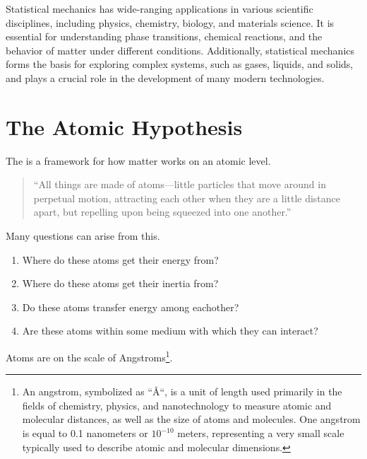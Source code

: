 Statistical mechanics has wide-ranging applications in various scientific disciplines, including physics, chemistry, biology, and materials science. It is essential for understanding phase transitions, chemical reactions, and the behavior of matter under different conditions. Additionally, statistical mechanics forms the basis for exploring complex systems, such as gases, liquids, and solids, and plays a crucial role in the development of many modern technologies.

\section{The Atomic Hypothesis}

The  is a framework for how matter works on an atomic level.

\begin{quotation}
	``All things are made of atoms—little particles that move around in perpetual motion, attracting each other when they are a little distance apart, but repelling upon being squeezed into one another.''
\end{quotation}

Many questions can arise from this.

\begin{enumerate}
	\item Where do these atoms get their energy from?
 	\item Where do these atoms get their inertia from?
  	\item Do these atoms transfer energy among eachother?
   	\item Are these atoms within some medium with which they can interact?
\end{enumerate}

Atoms are on the scale of Angstroms\footnote{An angstrom, symbolized as ``\AA``, is a unit of length used primarily in the fields of chemistry, physics, and nanotechnology to measure atomic and molecular distances, as well as the size of atoms and molecules. One angstrom is equal to 0.1 nanometers or $10^{-10}$ meters, representing a very small scale typically used to describe atomic and molecular dimensions.}. 
